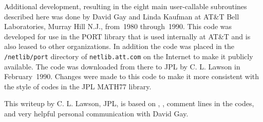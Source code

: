 \documentclass[twoside]{MATH77}
\begin{document}
Additional development, resulting in the eight main user-callable
subroutines described here was done by David Gay and Linda Kaufman at
AT\&T Bell Laboratories, Murray Hill N.J., from~1980 through~1990.
This code was developed for use in the PORT library that is used
internally at AT\&T and is also leased to other organizations. In
addition the code was placed in the {\tt /netlib/port} directory of
{\tt netlib.att.com} on the Internet to make it publicly available.
The code was downloaded from there to JPL by C. L.  Lawson in
February~1990. Changes were made to this code to make it more
consistent with the style of codes in the JPL MATH77 library.

This writeup by C.  L.  Lawson, JPL, is based on \cite{Dennis:1981:ANL},
\cite{Gay:1984:USS}, comment lines in the codes, and very helpful personal
communication with David Gay.
\end{document}

